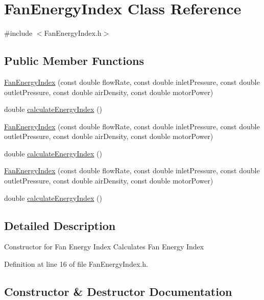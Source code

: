 \hypertarget{class_fan_energy_index}{}\section{Fan\+Energy\+Index Class Reference}
\label{class_fan_energy_index}


{\ttfamily \#include $<$Fan\+Energy\+Index.\+h$>$}

\subsection*{Public Member Functions}
\begin{DoxyCompactItemize}
\item 
\hyperlink{class_fan_energy_index_aea662b131f62c3b78196aabb0046c9a9}{Fan\+Energy\+Index} (const double flow\+Rate, const double inlet\+Pressure, const double outlet\+Pressure, const double air\+Density, const double motor\+Power)
\item 
double \hyperlink{class_fan_energy_index_ab1bf0268caaed615a5f00027b3801198}{calculate\+Energy\+Index} ()
\item 
\hyperlink{class_fan_energy_index_aea662b131f62c3b78196aabb0046c9a9}{Fan\+Energy\+Index} (const double flow\+Rate, const double inlet\+Pressure, const double outlet\+Pressure, const double air\+Density, const double motor\+Power)
\item 
double \hyperlink{class_fan_energy_index_ab1bf0268caaed615a5f00027b3801198}{calculate\+Energy\+Index} ()
\item 
\hyperlink{class_fan_energy_index_aea662b131f62c3b78196aabb0046c9a9}{Fan\+Energy\+Index} (const double flow\+Rate, const double inlet\+Pressure, const double outlet\+Pressure, const double air\+Density, const double motor\+Power)
\item 
double \hyperlink{class_fan_energy_index_ab1bf0268caaed615a5f00027b3801198}{calculate\+Energy\+Index} ()
\end{DoxyCompactItemize}


\subsection{Detailed Description}
Constructor for Fan Energy Index Calculates Fan Energy Index 

Definition at line 16 of file Fan\+Energy\+Index.\+h.



\subsection{Constructor \& Destructor Documentation}
\mbox{\label{class_fan_energy_index_aea662b131f62c3b78196aabb0046c9a9}} 
